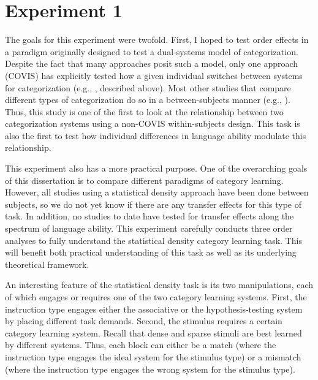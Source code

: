 \documentclass[../dissertation.tex]{subfiles}
\begin{document}
\section{Experiment 1}

The goals for this experiment were twofold. First, I hoped to test order effects in a paradigm originally designed to test a dual-systems model of categorization. Despite the fact that many approaches posit such a model, only one approach (COVIS) has explicitly tested how a given individual switches between systems for categorization (e.g., \citealp{Ashby2010, Erickson2008}, described above). Most other studies that compare different types of categorization do so in a between-subjects manner (e.g., \citealp{Kloos2008}). Thus, this study is one of the first to look at the relationship between two categorization systems using a non-COVIS within-subjects design. This task is also the first to test how individual differences in language ability modulate this relationship. \par
	This experiment also has a more practical purpose. One of the overarching goals of this dissertation is to compare different paradigms of category learning. However, all studies using a statistical density approach have been done between subjects, so we do not yet know if there are any transfer effects for this type of task. In addition, no studies to date have tested for transfer effects along the spectrum of language ability. This experiment carefully conducts three order analyses to fully understand the statistical density category learning task. This will benefit both  practical understanding of this task as well as its underlying theoretical framework. \par
	An interesting feature of the statistical density task is its two manipulations, each of which engages or requires one of the two category learning systems. First, the instruction type engages either the associative or the hypothesis-testing system by placing different task demands. Second, the stimulus requires a certain category learning system. Recall that dense and sparse stimuli are best learned by different systems. Thus, each block can either be a match (where the instruction type engages the ideal system for the stimulus type) or a mismatch (where the instruction type engages the wrong system for the stimulus type). \par 
\end{document}
